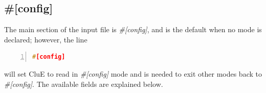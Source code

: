 \documentclass{book}
\begin{document}
\subsection{\#[config]}
The main section of the input file is \textit{\#[config]}, and is the default
when no mode is declared; however, the line
\begin{lstlisting}[frame=single,numbers=left,language=c]
#[config]
\end{lstlisting}
will set CluE to read in \textit{\#[config]} mode and is needed to exit
other modes back to \textit{\#[config]}.
The available fields are explained below.  
\end{document}
